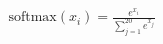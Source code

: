 \documentclass[preview]{standalone}
\begin{document}
\begin{align*}
\text{softmax}(x_{i}) = \frac{e^{x_{i}}}{\sum_{j=1}^{20} e^{x_{j}}}
\end{align*}
\end{document}
